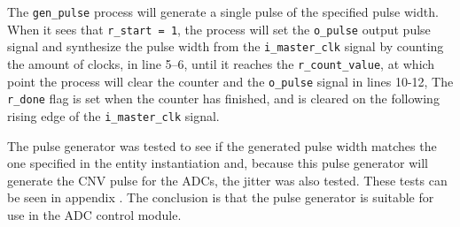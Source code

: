 

The \texttt{gen\_pulse} process will generate a single pulse of the specified pulse width. When it sees that \texttt{r\_start = 1}, the process will 
set the \texttt{o\_pulse} output pulse signal and synthesize the pulse width from the \texttt{i\_master\_clk} signal by counting the amount of clocks, 
in line 5--6, until it reaches the \texttt{r\_count\_value}, at which point the process will clear the counter and the \texttt{o\_pulse} signal in lines 10-12,
The \texttt{r\_done} flag is set when the counter has finished, and is cleared on the following rising edge of the \texttt{i\_master\_clk} signal.

The pulse generator was tested to see if the generated pulse width matches the one specified in the entity instantiation and, because this pulse generator will generate the CNV pulse for the ADCs, the jitter was also tested. These tests can be seen in appendix . The conclusion is that the pulse generator is suitable for use in the ADC control module.